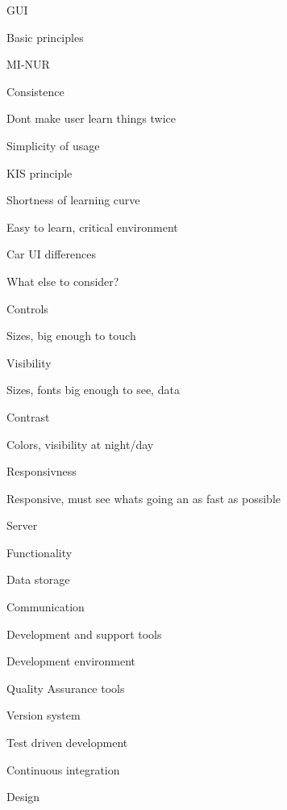 \sec GUI


\secc Basic principles

MI-NUR           

\seccc Consistence

Dont make user learn things twice

\seccc Simplicity of usage

KIS principle

\seccc Shortness of learning curve

Easy to learn, critical environment

\secc Car UI differences

What else to consider?

\seccc Controls

Sizes, big enough to touch 

\seccc Visibility

Sizes, fonts big enough to see, data

\seccc Contrast

Colors, visibility at night/day

\seccc Responsivness

Responsive, must see whats going an as fast as possible


\sec Server


\secc Functionality


\secc Data storage


\secc Communication


\sec Development and support tools


\secc Development environment


\secc Quality Assurance tools


\secc Version system


\secc Test driven development


\secc Continuous integration



\chap Design


